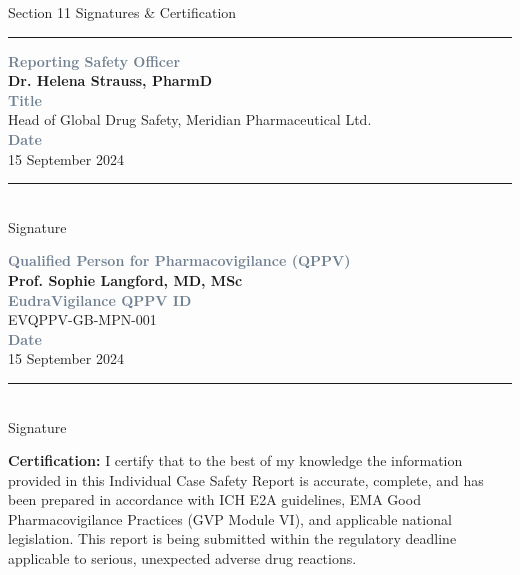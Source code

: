 \documentclass[11pt,a4paper]{scrartcl}
\newcommand{\fieldlabel}[1]{%
  \textcolor{SlateGray}{\footnotesize\textbf{#1}}%
}
\newcommand{\fieldvalue}[1]{%
  {\normalsize #1}%
}
\newcommand{\sectionrule}{%
  \vspace{1pt}%
  {\color{WarmGold}\rule{\linewidth}{1.5pt}}%
  \vspace{4pt}%
}
\begin{document}
\vspace{6mm}

\begin{sectionbox}{\faPen\quad Section 11 \textbar{} Signatures \& Certification}
\end{sectionbox}
\sectionrule

\noindent
\begin{minipage}[t]{0.48\linewidth}
\begin{sigbox}
\small
\fieldlabel{Reporting Safety Officer}\\[3pt]
\fieldvalue{\textbf{Dr. Helena Strauss, PharmD}}\\[2pt]
\fieldlabel{Title}\\
\fieldvalue{Head of Global Drug Safety, Meridian Pharmaceutical Ltd.}\\[2pt]
\fieldlabel{Date}\\
\fieldvalue{15 September 2024}\\[10pt]
{\color{LightRule}\rule{\linewidth}{0.5pt}}\\[3pt]
{\color{SlateGray}\scriptsize Signature}
\end{sigbox}
\end{minipage}%
\hfill%
\begin{minipage}[t]{0.48\linewidth}
\begin{sigbox}
\small
\fieldlabel{Qualified Person for Pharmacovigilance (QPPV)}\\[3pt]
\fieldvalue{\textbf{Prof. Sophie Langford, MD, MSc}}\\[2pt]
\fieldlabel{EudraVigilance QPPV ID}\\
\fieldvalue{EVQPPV-GB-MPN-001}\\[2pt]
\fieldlabel{Date}\\
\fieldvalue{15 September 2024}\\[10pt]
{\color{LightRule}\rule{\linewidth}{0.5pt}}\\[3pt]
{\color{SlateGray}\scriptsize Signature}
\end{sigbox}
\end{minipage}

\vspace{4mm}

\begin{notebox}
\footnotesize \faCheckCircle\quad \textbf{Certification:} I certify that to the best of my knowledge the information provided in this Individual Case Safety Report is accurate, complete, and has been prepared in accordance with ICH E2A guidelines, EMA Good Pharmacovigilance Practices (GVP Module VI), and applicable national legislation. This report is being submitted within the regulatory deadline applicable to serious, unexpected adverse drug reactions.
\end{notebox}
\end{document}
